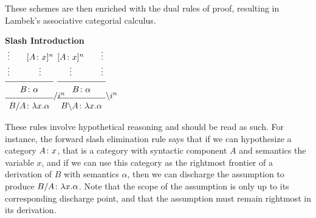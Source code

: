 These schemes are then enriched with the dual rules of proof,
resulting in Lambek's associative categorial calculus.
%
\begin{center}
{\bf Slash Introduction} \\[6pt]
{\small
$\infr{\infr{\; \sstc{\vdots \\ \vdots} 
             \qquad
             \sstc{\disch{\synsem{A}{x}}{n} 
                   \\
                   \vdots}}
            {\synsem{B}{\alpha}}
            {}}
      {\synsem{\fd{B}{A}}{\lam{x}{\alpha}}}
      {\fin{n}}$
\qquad \qquad
$\infr{\infr{\sstc{\disch{\synsem{A}{x}}{n} 
                   \\
                   \vdots}
             \qquad
              \sstc{\vdots \\ \vdots} \;}
            {\synsem{B}{\alpha}}
            {}}
      {\synsem{\bk{B}{A}}{\lam{x}{\alpha}}}
      {\bin{n}}$
}
\end{center}
%
These rules involve hypothetical reasoning and should be read as such.
For instance, the forward slash elimination rule says that if we can
hypothesize a category $A\/\colon x$, that is a category with
syntactic component $A$ and semantics the variable $x$, and if we can
use this category as the rightmost frontier of a derivation of $B$
with semantics $\alpha$, then we can discharge the assumption to
produce $B / A\/\colon \lambda x . \alpha$.  Note that the scope of
the assumption is only up to its corresponding discharge point, and
that the assumption must remain rightmost in its derivation.

